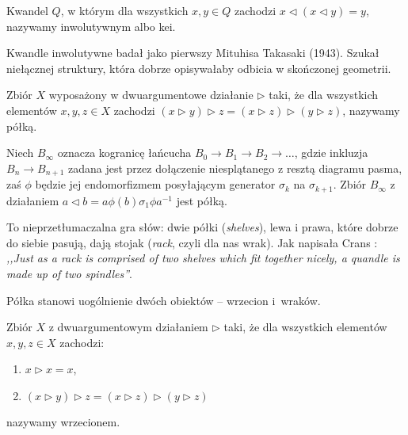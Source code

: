 \begin{definition}
%
%
    Kwandel $Q$, w którym dla wszystkich $x, y \in Q$ zachodzi $x \triangleleft (x \triangleleft y) = y$, nazywamy inwolutywnym albo kei.
\end{definition}

Kwandle inwolutywne badał jako pierwszy Mituhisa Takasaki (1943).
%
Szukał niełącznej struktury, która dobrze opisywałaby odbicia w skończonej geometrii.

\begin{definition}[półka]
%
    Zbiór $X$ wyposażony w dwuargumentowe działanie $\triangleright$ taki, że dla wszystkich elementów $x, y, z \in X$ zachodzi $(x \triangleright y) \triangleright z = (x \triangleright z) \triangleright (y \triangleright z)$, nazywamy półką.
\end{definition}

\begin{example}
%
    Niech $B_\infty$ oznacza kogranicę łańcucha $B_0 \to B_1 \to B_2 \to \ldots$, gdzie inkluzja $B_{n} \to B_{n+1}$ zadana jest przez dołączenie niesplątanego z resztą diagramu pasma, zaś $\phi$ będzie jej endomorfizmem posyłającym generator $\sigma_k$ na $\sigma_{k+1}$.
    Zbiór $B_\infty$ z działaniem $a \triangleleft b = a\phi(b)\sigma_1 \phi{a} ^{-1}$ jest półką.
\end{example}

To nieprzetłumaczalna gra słów: dwie półki (\emph{shelves}), lewa i prawa, które dobrze do siebie pasują, dają stojak (\emph{rack}, czyli dla nas wrak).
Jak napisała Crans \cite[s. 86]{crans04}: \emph{,,Just as a rack is comprised of two shelves which fit together nicely, a quandle is made up of two spindles''}.
%

Półka stanowi uogólnienie dwóch obiektów -- wrzecion i~wraków.

\begin{definition}[wrzeciono]
%
    Zbiór $X$ z dwuargumentowym działaniem $\triangleright$ taki, że dla wszystkich elementów $x, y, z \in X$ zachodzi:
    \begin{enumerate}
        \item $x \triangleright x = x$,
        \item $(x \triangleright y) \triangleright z = (x \triangleright z) \triangleright (y \triangleright z)$
    \end{enumerate}
    nazywamy wrzecionem.
\end{definition}

